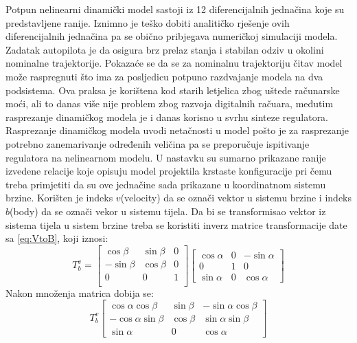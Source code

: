 Potpun nelinearni dinamički model sastoji iz 12 diferencijalnih jednačina koje su predstavljene ranije. 
Iznimno je teško dobiti analitičko rješenje ovih diferencijalnih jednačina pa se obično pribjegava numeričkoj
simulaciji modela. Zadatak autopilota je da osigura brz prelaz stanja i stabilan odziv u okolini nominalne trajektorije. 
Pokazaće se da se za nominalnu trajektoriju čitav model može raspregnuti što ima za posljedicu 
potpuno razdvajanje modela na dva podsistema. Ova praksa je korištena kod starih letjelica zbog 
uštede računarske moći, ali to danas više nije problem zbog razvoja digitalnih račuara, međutim rasprezanje 
dinamičkog modela je i danas korisno u svrhu sinteze regulatora. Rasprezanje dinamičkog modela 
uvodi netačnosti u model pošto je za rasprezanje potrebno zanemarivanje određenih veličina pa se 
preporučuje ispitivanje regulatora na nelinearnom modelu. U nastavku su sumarno prikazane ranije izvedene 
relacije koje opisuju model projektila krstaste konfiguracije pri čemu treba primjetiti da su ove jednačine 
sada prikazane u koordinatnom sistemu brzine. Korišten je indeks $v$(velocity) da se označi vektor u sistemu brzine
i indeks $b$(body) da se označi vekor u sistemu tijela. Da bi se transformisao vektor iz sistema tijela u sistem brzine 
treba se koristiti inverz matrice transformacije date sa \ref{eq:VtoB}, koji iznosi:
\begin{equation}
    T_b^v = \begin{bmatrix}
            \cos\beta & \sin\beta & 0\\
            -\sin\beta & \cos\beta & 0\\
            0 & 0& 1\\
        \end{bmatrix}
        \begin{bmatrix}
            \cos\alpha & 0 & -\sin\alpha \\
        0& 1& 0\\
        \sin\alpha & 0 & \cos\alpha
        \end{bmatrix}
\end{equation}
Nakon množenja matrica dobija se:
\begin{equation}
    T_b^v\begin{bmatrix}
        \cos\alpha\cos\beta & \sin\beta & -\sin\alpha\cos\beta \\
        -\cos\alpha\sin\beta & \cos\beta & \sin\alpha\sin\beta \\
        \sin\alpha & 0 & \cos\alpha
    \end{bmatrix}
\end{equation}
